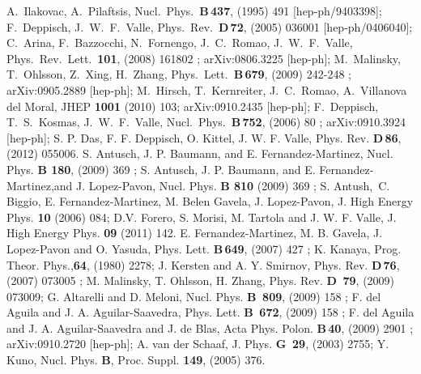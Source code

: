 \documentclass[a4paper,11pt]{article}
\begin{document}
\begin{thebibliography}{99}
  A.~Ilakovac, A.~Pilaftsis,
  Nucl.\ Phys.\  {\bf B\,437}, (1995)  491 
  [hep-ph/9403398];
 F.~Deppisch, J.~W.~F.~Valle,
 Phys.\ Rev.\  {\bf D\,72},  (2005) 036001  [hep-ph/0406040];  
C.~Arina, F.~Bazzocchi, N.~Fornengo, J.~C.~Romao, J.~W.~F.~Valle,
  Phys.\ Rev.\ Lett.\  {\bf 101},  (2008)  161802 ; arXiv:0806.3225 [hep-ph]; 
 M.~Malinsky, T.~Ohlsson, Z.~Xing, H.~Zhang,
  Phys.\ Lett.\  {\bf B\,679},  (2009) 242-248 ; arXiv:0905.2889 [hep-ph];
 M.~Hirsch, T.~Kernreiter, J.~C.~Romao, A.~Villanova del Moral,
  JHEP {\bf 1001} (2010) 103; arXiv:0910.2435 [hep-ph];
F.~Deppisch, T.~S.~Kosmas, J.~W.~F.~Valle,
  Nucl.\ Phys.\  {\bf B\,752},  (2006) 80 ; arXiv:0910.3924 [hep-ph]; 
  S. P. Das, F. F. Deppisch, O. Kittel, J. W. F. Valle, Phys. Rev. {\bf D\,86},  (2012) 055006.
 S. Antusch, J. P. Baumann, and E. Fernandez-Martinez,
  Nucl. Phys. {\bf B 180}, (2009) 369 ; S. Antusch, J. P. Baumann, and
  E. Fernandez-Martinez,and J. Lopez-Pavon, Nucl. Phys. {\bf B 810}  (2009) 369 ;
S. Antush,~C. Biggio, E. Fernandez-Martinez, M. Belen Gavela, 
J. Lopez-Pavon, J. High Energy Phys. {\bf 10} (2006) 084; D.V. Forero,
S. Morisi, M. Tartola and J. W. F. Valle, J. High Energy Phys. {\bf 09} (2011) 142.
 E. Fernandez-Martinez, M. B. Gavela, J. Lopez-Pavon and O. Yasuda, Phys. Lett. {\bf B\,649}, (2007)  427 ;  
                   K. Kanaya, Prog. Theor. Phys.,{\bf 64}, (1980)  2278; 
                   J. Kersten and A. Y. Smirnov, Phys. Rev. {\bf D\,76},  (2007) 073005 ; 
                   M. Malinsky, T. Ohlsson, H. Zhang, Phys. Rev. {\bf D\, 79},  (2009) 073009; 
                   G. Altarelli and D. Meloni, Nucl. Phys. {\bf B\, 809},  (2009) 158 ; 
                   F. del Aguila and J. A. Aguilar-Saavedra, Phys. Lett. {\bf B\, 672},  (2009) 158 ; 
                   F. del Aguila and J. A. Aguilar-Saavedra and J. de Blas, Acta Phys. Polon. {\bf B\,40}, 
                    (2009) 2901 ; arXiv:0910.2720 [hep-ph]; 
                   A. van der Schaaf, J. Phys. {\bf G\, 29},  (2003) 2755; Y. Kuno, Nucl. Phys. {\bf B}, Proc. Suppl. {\bf 149},  (2005) 376.


\end{thebibliography}
\end{document}
